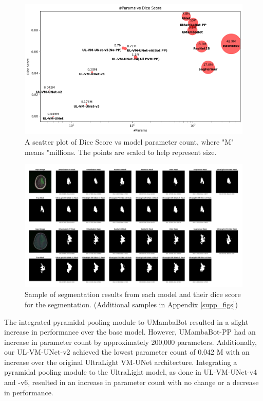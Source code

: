 \documentclass[conference]{IEEEtran}
\begin{document}
\begin{figure}[ht]
    \centering
    \includegraphics[width=\columnwidth]{imgs/balls.png}
    \caption{A scatter plot of Dice Score vs model parameter count, where "M" means "millions. The points are scaled to help represent size.}
    \label{fig:balls}
\end{figure}

\begin{figure}[ht]
    \centering
    \includegraphics[width=\columnwidth]{imgs/tumor_seg_ex.png}
    \caption{Sample of segmentation results from each model and their dice score for the segmentation. (Additional samples in Appendix \ref{supp_figs})}
    \label{fig:segs}
\end{figure}

The integrated pyramidal pooling module to UMambaBot resulted in a slight increase in performance over the base model. However, UMambaBot-PP had an increase in parameter count by approximately 200,000 parameters. Additionally, our UL-VM-UNet-v2 achieved the lowest parameter count of 0.042 M with an increase over the original UltraLight VM-UNet architecture. Integrating a pyramidal pooling module to the UltraLight model, as done in UL-VM-UNet-v4 and -v6, resulted in an increase in parameter count with no change or a decrease in performance. 
\end{document}
